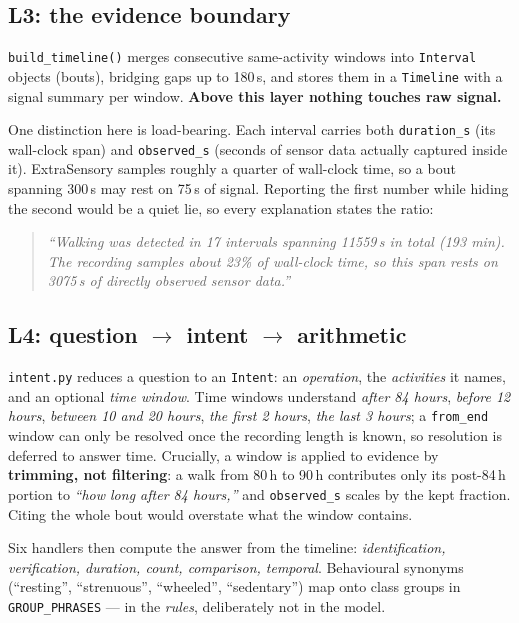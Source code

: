 \documentclass[11pt,a4paper]{article}
\newcommand{\code}[1]{\texttt{\small #1}}
\begin{document}
\subsection{L3: the evidence boundary}

\code{build\_timeline()} merges consecutive same-activity windows into \code{Interval}
objects (bouts), bridging gaps up to 180\,s, and stores them in a \code{Timeline} with a
signal summary per window. \textbf{Above this layer nothing touches raw signal.}

One distinction here is load-bearing. Each interval carries both \code{duration\_s} (its
wall-clock span) and \code{observed\_s} (seconds of sensor data actually captured inside
it). ExtraSensory samples roughly a quarter of wall-clock time, so a bout spanning 300\,s
may rest on 75\,s of signal. Reporting the first number while hiding the second would be
a quiet lie, so every explanation states the ratio:

\begin{quote}\small
\emph{``Walking was detected in 17 intervals spanning 11559\,s in total (193 min). The
recording samples about 23\% of wall-clock time, so this span rests on 3075\,s of
directly observed sensor data.''}
\end{quote}

\subsection{L4: question $\rightarrow$ intent $\rightarrow$ arithmetic}

\code{intent.py} reduces a question to an \code{Intent}: an \emph{operation}, the
\emph{activities} it names, and an optional \emph{time window}. Time windows understand
\emph{after 84 hours}, \emph{before 12 hours}, \emph{between 10 and 20 hours}, \emph{the
first 2 hours}, \emph{the last 3 hours}; a \code{from\_end} window can only be resolved
once the recording length is known, so resolution is deferred to answer time. Crucially,
a window is applied to evidence by \textbf{trimming, not filtering}: a walk from 80\,h to
90\,h contributes only its post-84\,h portion to \emph{``how long after 84 hours,''} and
\code{observed\_s} scales by the kept fraction. Citing the whole bout would overstate
what the window contains.

Six handlers then compute the answer from the timeline: \emph{identification,
verification, duration, count, comparison, temporal}. Behavioural synonyms (``resting'',
``strenuous'', ``wheeled'', ``sedentary'') map onto class groups in \code{GROUP\_PHRASES}
--- in the \emph{rules}, deliberately not in the model.
\end{document}
